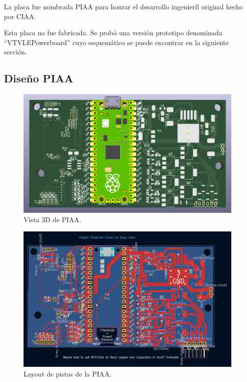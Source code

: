 La placa fue nombrada PIAA para honrar el desarrollo ingenieríl original hecho por CIAA.

Esta placa no fue fabricada. Se probó una versión prototipo denominada ``VTVLEPowerboard'' cuyo esquemático se puede encontrar en la siguiente sección.
\null\newpage
\clearpage
\subsection{Diseño PIAA} 

\begin{figure}[htb]
    \centering
    \includegraphics[width=\linewidth]{fig/piaa3d.png}
    \caption{Vista 3D de PIAA.}
    \label{fig:piaa3d}
\end{figure}

\begin{figure}[htb]
    \centering
    \includegraphics[width=\linewidth]{fig/piaa_layout.png}
    \caption{Layout de pistas de la PIAA.}
    \label{fig:layoutpiaa}
\end{figure}

